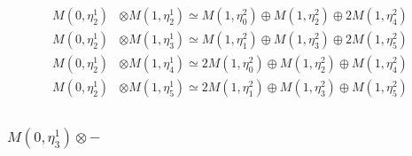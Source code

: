 \begin{align*}
M(0,\eta^{1}_{2}) &\otimes M(1,\eta^{1}_{2}) \simeq M(1,\eta^{2}_{0}) \oplus M(1,\eta^{2}_{2}) \oplus 2 M(1,\eta^{2}_{4}) \\
M(0,\eta^{1}_{2}) &\otimes M(1,\eta^{1}_{3}) \simeq M(1,\eta^{2}_{1}) \oplus M(1,\eta^{2}_{3}) \oplus 2 M(1,\eta^{2}_{5}) \\
M(0,\eta^{1}_{2}) &\otimes M(1,\eta^{1}_{4}) \simeq 2 M(1,\eta^{2}_{0}) \oplus M(1,\eta^{2}_{2}) \oplus M(1,\eta^{2}_{4}) \\
M(0,\eta^{1}_{2}) &\otimes M(1,\eta^{1}_{5}) \simeq 2 M(1,\eta^{2}_{1}) \oplus M(1,\eta^{2}_{3}) \oplus M(1,\eta^{2}_{5}) \\
\end{align*}

\subsubsection{$ M(0,\eta^{1}_{3})\otimes -$}
